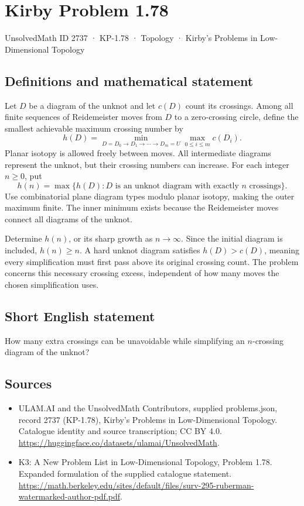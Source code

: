\documentclass[11pt,a4paper]{article}
\begin{document}
\section*{Kirby Problem 1.78}\label{2737}
{\small UnsolvedMath ID 2737 · KP-1.78 · Topology · Kirby's Problems in Low-Dimensional Topology}
\subsection{Definitions and mathematical statement}
Let $D$ be a diagram of the unknot and let $c(D)$ count its crossings.
Among all finite sequences of Reidemeister moves from $D$ to a zero-crossing
circle, define the smallest achievable maximum crossing number by
\[
h(D)=\min_{D=D_0\to D_1\to\cdots\to D_m=U}
          \max_{0\leq i\leq m}c(D_i).
\]
Planar isotopy is allowed freely between moves. All intermediate diagrams
represent the unknot, but their crossing numbers can increase.
For each integer $n\geq0$, put
\[
h(n)=\max\{h(D):D\text{ is an unknot diagram with exactly }n\text{ crossings}\}.
\]
Use combinatorial plane diagram types modulo planar isotopy, making the outer
maximum finite. The inner minimum exists because the Reidemeister moves connect
all diagrams of the unknot.

Determine $h(n)$, or its sharp growth as $n\to\infty$. Since the initial diagram
is included, $h(n)\geq n$. A hard unknot diagram satisfies $h(D)>c(D)$, meaning
every simplification must first pass above its original crossing count. The
problem concerns this necessary crossing excess, independent of how many moves
the chosen simplification uses.
\subsection{Short English statement}
How many extra crossings can be unavoidable while simplifying an $n$-crossing diagram of the unknot?
\subsection{Sources}
\begin{itemize}
\item[S1] ULAM.AI and the UnsolvedMath Contributors, supplied problems.json, record 2737 (KP-1.78), Kirby's Problems in Low-Dimensional Topology. Catalogue identity and source transcription; CC BY 4.0.
\url{https://huggingface.co/datasets/ulamai/UnsolvedMath}.
\item[S2] K3: A New Problem List in Low-Dimensional Topology, Problem 1.78. Expanded formulation of the supplied catalogue statement.
\url{https://math.berkeley.edu/sites/default/files/surv-295-ruberman-watermarked-author-pdf.pdf}.
\end{itemize}
\end{document}
